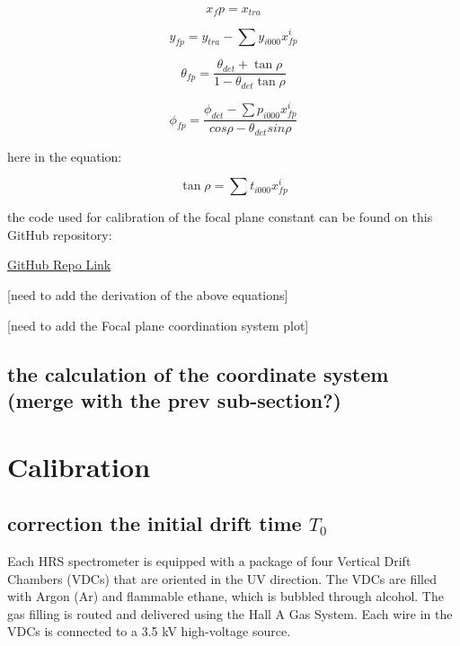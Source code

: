 \begin{equation}
    x_fp = x_{tra}    \label{eq:cpt3_fps_1}
\end{equation}

\begin{equation}
    y_{fp} = y_{tra} - \sum y_{i000}x^i_{fp}  
\end{equation}

\begin{equation}
\theta_{fp} = \frac{\theta_{det} + \tan\rho}{1 - \theta_{det}\tan\rho}
\end{equation}


\begin{equation}
    \phi_{fp} = \frac{\phi_{det} - \sum p_{i000}x^i_{fp}}{cos \rho - \theta_{det} sin\rho}
\end{equation}

here  in the equation:

\begin{equation}
    \tan\rho  = \sum t_{i000}x^i_{fp}
\end{equation}


the code used for calibration of the focal plane constant can be found on this GitHub repository: 

\hyperlink{https://github.com/Jiansiyu/GeneralScripts/blob/master/vdcConstantOpt}{GitHub Repo Link}

[need to add the derivation of the above equations]

[need to add the Focal plane coordination system plot]

\subsection{the calculation of the coordinate system (merge with the prev sub-section?)}

\section{Calibration}


\subsection{correction the initial drift time $T_0$}

Each HRS spectrometer is equipped with a package of four Vertical Drift Chambers (VDCs) that are oriented in the UV direction. The VDCs are filled with Argon (Ar) and flammable ethane, which is bubbled through alcohol. The gas filling is routed and delivered using the Hall A Gas System. Each wire in the VDCs is connected to a 3.5 kV high-voltage source.

